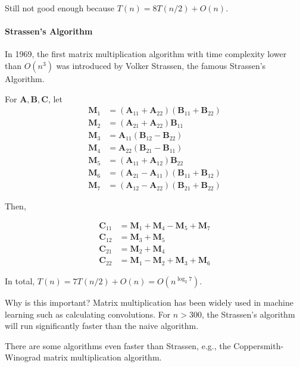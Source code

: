                 Still not good enough because $T(n) = 8T(n/2) + O(n)$. 

            \paragraph{Strassen's Algorithm}

                In 1969, the first matrix multiplication algorithm with time complexity lower than $O(n^3)$ was introduced by Volker Strassen, the famous Strassen's Algorithm. 

                For $\mathbf{A}, \mathbf{B}, \mathbf{C}$, let
                \begin{align*}
                    \mathbf{M}_1 &= (\mathbf{A}_{11} + \mathbf{A}_{22}) (\mathbf{B}_{11} + \mathbf{B}_{22})\\
                    \mathbf{M}_2 &= (\mathbf{A}_{21} + \mathbf{A}_{22}) \mathbf{B}_{11}\\
                    \mathbf{M}_3 &= \mathbf{A}_{11} (\mathbf{B}_{12} - \mathbf{B}_{22})\\
                    \mathbf{M}_4 &= \mathbf{A}_{22} (\mathbf{B}_{21} - \mathbf{B}_{11})\\
                    \mathbf{M}_5 &= (\mathbf{A}_{11} + \mathbf{A}_{12}) \mathbf{B}_{22}\\
                    \mathbf{M}_6 &= (\mathbf{A}_{21} - \mathbf{A}_{11}) (\mathbf{B}_{11} + \mathbf{B}_{12}) \\
                    \mathbf{M}_7 &= (\mathbf{A}_{12} - \mathbf{A}_{22}) (\mathbf{B}_{21} + \mathbf{B}_{22})
                \end{align*}

                Then, 

                \begin{align*}
                    \mathbf{C}_{11} &= \mathbf{M}_1 + \mathbf{M}_4 - \mathbf{M}_5 + \mathbf{M}_7\\
                    \mathbf{C}_{12} &= \mathbf{M}_3 + \mathbf{M}_5\\
                    \mathbf{C}_{21} &= \mathbf{M}_2 + \mathbf{M}_4\\
                    \mathbf{C}_{22} &= \mathbf{M}_1 - \mathbf{M}_2 + \mathbf{M}_3 + \mathbf{M}_6
                \end{align*}

                In total, $T(n) = 7T(n/2) + O(n) = O(n^{\log_2 7})$.

                Why is this important? Matrix multiplication has been widely used in machine learning such as calculating convolutions. For $n > 300$, the Strassen's algorithm will run significantly faster than the naive algorithm.

                There are some algorithms even faster than Strassen, e.g., the Coppersmith-Winograd matrix multiplication algorithm.
